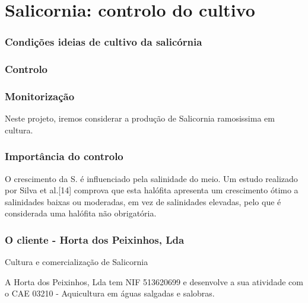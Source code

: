 \chapter{Salicornia: controlo do cultivo}

\subsection{Condições ideias de cultivo da salicórnia}

\subsection{Controlo}

\subsection{Monitorização}




Neste projeto, iremos considerar a produção de Salicornia ramosissima em cultura.



\subsection{Importância do controlo}


O crescimento da S.  é influenciado pela salinidade do meio. Um
estudo realizado por Silva et al.[14] comprova que esta halófita apresenta um crescimento
ótimo a salinidades baixas ou moderadas, em vez de salinidades elevadas, pelo que é
considerada uma halófita não obrigatória.


\subsection{O cliente - Horta dos Peixinhos, Lda}


Cultura e comercialização de Salicornia


A Horta dos Peixinhos, Lda tem NIF 513620699 e desenvolve a sua atividade com o CAE 03210 - Aquicultura em águas salgadas e salobras.





\section{}


